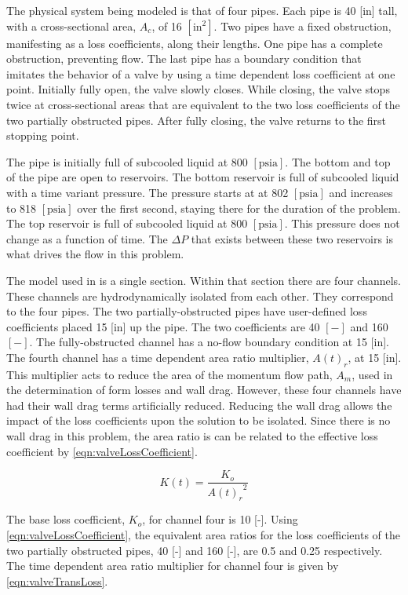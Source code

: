The physical system being modeled is that of four pipes.
Each pipe is 40 [in] tall, with a cross-sectional area, $ A_{c} $, of 16 $[\text{in}^{2}]$.
Two pipes have a fixed obstruction, manifesting as a loss coefficients, along their lengths.
One pipe has a complete obstruction, preventing flow.
The last pipe has a boundary condition that imitates the behavior of a valve by using a  time dependent loss coefficient at one point.
Initially fully open, the valve slowly closes.
While closing, the valve stops twice at cross-sectional areas that are equivalent to the two loss coefficients of the two partially obstructed pipes.
After fully closing, the valve returns to the first stopping point.

The pipe is initially full of subcooled liquid at 800 $[ \text{psia}] $.
The bottom and top of the pipe are open to reservoirs.
The bottom reservoir is full of subcooled liquid with a time variant pressure.
The pressure starts at at 802 $[ \text{psia} ] $ and increases to 818 $[ \text{psia}]$ over the first second, staying there for the duration of the problem.
The top reservoir is full of subcooled liquid at 800 $[\text{psia} ] $.
This pressure does not change as a function of time.
The $\Delta P$ that exists between these two reservoirs is what drives the flow in this problem.

The model used in \cobra{} is a single section.
Within that section there are four channels.
These channels are hydrodynamically isolated from each other.
They correspond to the four pipes.
The two partially-obstructed pipes have user-defined loss coefficients placed 15 [in] up the pipe.
The two coefficients are 40 $[-]$ and 160 $[-]$.
The fully-obstructed channel has a no-flow boundary condition at 15 [in].
The fourth channel has a time dependent area ratio multiplier, $A(t)_r$, at 15 [in].
This multiplier acts to reduce the area of the momentum flow path, $A_m$, used in the determination of form losses and wall drag.
However, these four channels have had their wall drag terms artificially reduced.
Reducing the wall drag allows the impact of the loss coefficients upon the solution to be isolated.
Since there is no wall drag in this problem, the area ratio is can be related to the effective loss coefficient by \eqref{eqn:valveLossCoefficient}.

\begin{equation}
\label{eqn:valveLossCoefficient}
K(t) = \frac{K_{o}}{{A(t)_r}^2}
\end{equation}

The base loss coefficient, $K_o$, for channel four is 10 [-].
Using \eqref{eqn:valveLossCoefficient}, the equivalent area ratios for the loss coefficients of the two partially obstructed pipes, 40 [-] and 160 [-], are 0.5 and 0.25 respectively.
The time dependent area ratio multiplier for channel four is given by \eqref{eqn:valveTransLoss}.

